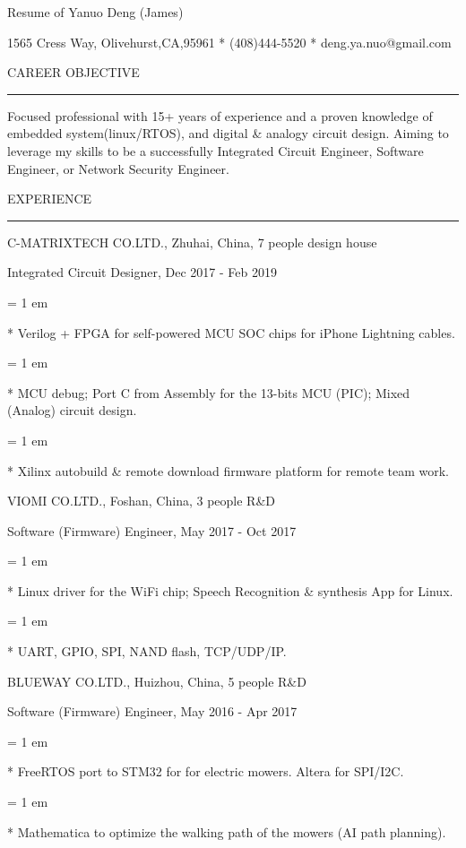 

\centerline{ \FFbg
Resume of Yanuo Deng (James)
}

\centerline{ %
1565 Cress Way, Olivehurst,CA,95961
*
(408)444-5520
*
deng.ya.nuo@gmail.com
}

{ \medbreak } { \FFbg
CAREER OBJECTIVE
}

{ \smallbreak } {\par\noindent\hrule} { \smallbreak }

    Focused professional with 15+ years of experience
and a proven knowledge of embedded system(linux/RTOS),
and digital \& analogy circuit design.
    Aiming to leverage my skills to be a successfully
Integrated Circuit Engineer,
Software Engineer,
or Network Security Engineer.

{ \medbreak } { \FFbg
EXPERIENCE
}
{ \smallbreak } {\par\noindent\hrule} { \smallbreak }

{ \medbreak } { \FFbg
C-MATRIXTECH CO.LTD., Zhuhai, China, 7 people design house
}

{ \FFte
Integrated Circuit Designer, Dec 2017 - Feb 2019
}

{ \parindent = 1 em \item{*}
 Verilog + FPGA for self-powered MCU SOC chips for iPhone Lightning cables.
}

{ \parindent = 1 em \item{*}
 MCU debug; Port C from Assembly for the 13-bits MCU (PIC); Mixed (Analog) circuit design.
}
{ \parindent = 1 em \item{*}
 Xilinx autobuild \& remote download firmware platform for remote team work.
}

{ \medbreak } { \FFbg
VIOMI CO.LTD., Foshan, China, 3 people R\&D
}

{ \FFte
Software (Firmware) Engineer, May 2017 - Oct 2017
}

{ \parindent = 1 em \item{*}
 Linux driver for the WiFi chip; Speech Recognition \& synthesis App for Linux.
 }
{ \parindent = 1 em \item{*}
 UART, GPIO, SPI, NAND flash, TCP/UDP/IP.
 }

{ \medbreak } { \FFbg
BLUEWAY CO.LTD., Huizhou, China, 5 people R\&D
}

{ \FFte
Software (Firmware) Engineer, May 2016 - Apr 2017
}
{ \parindent = 1 em \item{*}
 FreeRTOS port to STM32 for for electric mowers. Altera for SPI/I2C.
}
{ \parindent = 1 em \item{*}
Mathematica to optimize the walking path of the mowers (AI path planning).
}

